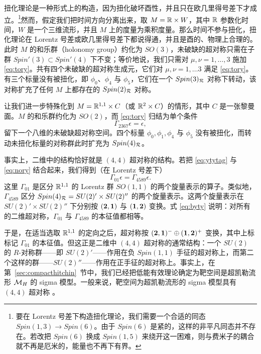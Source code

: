 扭化理论是一种形式上的构造，因为扭化破坏酉性，并且只在欧几里得号差下才成立。\footnote{要在 Lorentz 号差下构造扭化理论，我们需要一个合适的同态 $Spin(1,3)\to Spin(6)$。由于 $Spin(6)$ 是紧的，这样的非平凡同态并不存在。若改把 $Spin(6)$ 换成 $Spin(1,5)$ 来绕开这一困难，则与费米子的耦合就不再是厄米的，能量也不再下有界。}然而，假定我们把时间方向分离出来，取 $M=\Bbb{R}\times W$，其中 $\Bbb{R}$ 参数化时间，$W$ 是一个三维流形，并且 $M$ 上的度量为乘积度量。那么时间不参与扭化，扭化理论在 Lorentz 号差或欧几里得号差下都说得通，并且是酉的、物理上合理的。此时 $M$ 的和乐群（holonomy group）约化为 $SO(3)$，未破缺的超对称只需在子群 $Spin'(3)\subset Spin'(4)$ 下不变；等价地说，我们只需对 $\mu,\nu=1,\dots,3$ 施加 \eqref{eq:tory}。共有四个未破缺的超对称生成元，它们对 $\mu,\nu=1,\dots 3$ 满足 \eqref{eq:tory}。有三个标量没有被扭化，即 $\phi_0$、$\phi_4$ 与 $\phi_5$，它们在一个 $Spin(3)_{\cal R}$ 对称下转动，该对称扩充了任何 $M$ 上都存在的 $Spin(2)_{\cal R}$ 对称。

让我们进一步特殊化到 $M=\Bbb{R}^{1,1}\times C$（或 $\Bbb{R}^2\times C$）的情形，其中 $C$ 是一张黎曼面。$M$ 的和乐群约化为 $SO(2)$，而 \eqref{eq:tory} 归结为单个条件
\begin{equation*}
\tag*{(5.3)}
\Gamma_{2367}\epsilon=\epsilon,\label{eq:ytytag}
\end{equation*}
留下一个八维的未破缺超对称空间。四个标量 $\phi_0,\phi_1,\phi_4$ 与 $\phi_5$ 没有被扭化，而转动未扭化标量的对称群此时扩充为 $Spin(4)_{\cal R}$。

事实上，二维中的结构恰好就是 $(4,4)$ 超对称的结构。若把 \eqref{eq:ytytag} 与 \eqref{eq:nory} 结合起来，我们得到（在 Lorentz 号差下）%
\setcounter{equation}{3}
\begin{equation}\label{eq:byty}
\Gamma_{01}\epsilon
=\Gamma_{4589}\epsilon.
\end{equation}
 这里 $\Gamma_{01}$ 是区分 $\Bbb{R}^{1,1}$ 的 Lorentz 群 $SO(1,1)$ 的两个旋量表示的算子。类似地，$\Gamma_{4589}$ 区分 $Spin(4)_{\cal R}=SU(2)'\times SU(2)''$ 的两个旋量表示。这两个旋量表示在 $SU(2)'\times SU(2)''$ 下分别按 $({\bf 2},{\bf 1})$ 与 $({\bf 1},{\bf 2})$ 变换。式 \eqref{eq:byty} 说明：对所有的二维超对称，$\Gamma_{01}$ 与 $\Gamma_{4589}$ 的本征值都相等。

于是，在适当选取 $\Bbb{R}^{1,1}$ 的定向之后，超对称按 $({\bf 2},{\bf 1})^-\oplus({\bf 1},{\bf 2})^+$ 变换，其中上标标记 $\Gamma_{01}$ 的本征值。但这正是二维中 $(4,4)$ 超对称的通常结构：一个 $SU(2)$ 的 $R$-对称群——即 $SU(2)'$——作用在负 $Spin(1,1)$ 手征的超对称上，而第二个这样的群——$SU(2)''$——作用在正手征的超对称上。事实上，在第~\ref{sec:compacthitchin}~节中，我们已经把低能有效理论确定为靶空间是超凯勒流形 $\MH$ 的 sigma 模型。一般来说，靶空间为超凯勒流形的 sigma 模型具有 $(4,4)$ 超对称 \cite{ref65}。

